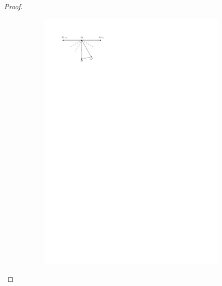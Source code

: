 \begin{proof}
  \begin{figure}[h]
      \centering
      \begin{subfigure}[b]{0.5\linewidth}
          \includegraphics[width=\linewidth]{redAlgo/img/walkProofA}
          \caption{}
      \end{subfigure}%
      \begin{subfigure}[b]{0.5\linewidth}

\end{subfigure}
\end{figure}
\end{proof}
